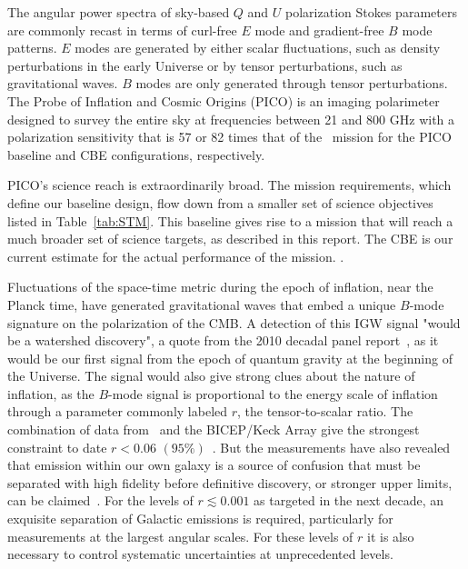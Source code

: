 \documentclass[PICOReport.tex]{subfiles}
\begin{document}

The angular power spectra of sky-based $Q$ and $U$ polarization Stokes parameters are commonly recast in terms of curl-free $E$ mode and gradient-free $B$ mode patterns. $E$ modes are generated by either scalar fluctuations, such as density perturbations in the early Universe or by tensor perturbations, such as gravitational waves. $B$ modes are only generated through tensor perturbations. The Probe of Inflation and Cosmic Origins (PICO) is an imaging polarimeter designed to survey the entire sky at frequencies between 21 and 800 GHz with a polarization sensitivity that is 57 or 82 times that of the \planck\ mission for the PICO baseline and \ac{CBE} configurations, respectively. 

PICO's science reach is extraordinarily broad. The mission requirements, which define our baseline design, flow down from a smaller set of science objectives listed in Table~\ref{tab:STM}. This baseline gives rise to a mission that will reach a much broader set of science targets, as described in this report. 
The \ac{CBE} is our current estimate for the actual performance of the mission. . 

Fluctuations of the space-time metric during the epoch of inflation, near the Planck time, have generated gravitational waves that embed a unique $B$-mode signature on the polarization of the CMB. A detection of this \ac{IGW} signal "would be a watershed discovery", a quote from the 2010 decadal panel report~\citep{blandford2010}, as it would be our first signal from the epoch of quantum gravity at the beginning of the Universe. The signal would also give strong clues about the nature of inflation, as the $B$-mode signal is proportional to the energy scale of inflation through a parameter commonly labeled $r$, the tensor-to-scalar ratio. The combination of data from \planck\ and the BICEP/Keck Array give the strongest constraint to date $r<0.06\,\, (95\%)$~\citep{2018arXiv181005216A}.
But the measurements have also revealed that emission within our own galaxy is a source of confusion that must be separated with high fidelity before definitive discovery, or stronger upper limits, can be claimed~\citep{whichplanck}. For the levels of $r\lesssim 0.001$ as targeted in the next decade, an exquisite separation of Galactic emissions is required, particularly for measurements at the largest angular scales. For these levels of $r$ it is also necessary to control systematic uncertainties at unprecedented levels. 
\end{document}
